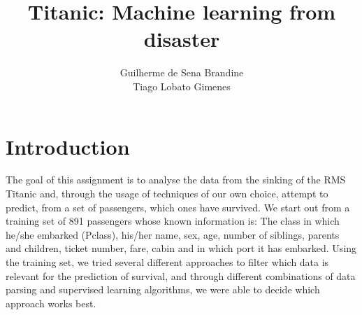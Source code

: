 \documentclass[12pt,a4paper]{article}
\author{Guilherme de Sena Brandine \\ Tiago Lobato Gimenes}
\title{Titanic: Machine learning from disaster}
\begin{document}
\maketitle

\section*{Introduction}
The goal of this assignment is to analyse the data from the sinking of the RMS Titanic and, through the usage of techniques of our own choice, attempt to predict, from a set of passengers, which ones have survived. We start out from a training set of 891 passengers whose known information is: The class in which he/she embarked (Pclass), his/her name, sex, age, number of siblings, parents and children, ticket number, fare, cabin and in which port it has embarked. Using the training set, we tried several different approaches to filter which data is relevant for the prediction of survival, and through different combinations of data parsing and supervised learning algorithms, we were able to decide which approach works best.
\end{document}
